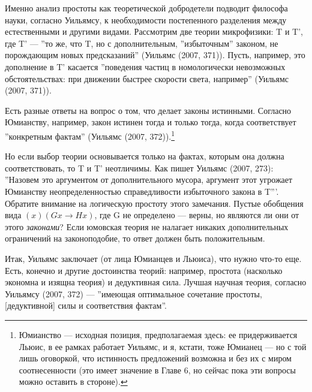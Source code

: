 \documentclass[11pt]{book}
\begin{document}
Именно анализ простоты как теоретической добродетели подводит философа науки, согласно Уильямсу, к необходимости постепенного разделения между естественными и другими видами. Рассмотрим две теории микрофизики: T и T', где T' --- ''то же, что T, но с дополнительным, ''избыточным'' законом, не порождающим новых предсказаний'' (Уильямс (2007, 371)). Пусть, например, это дополнение в T' касается ''поведения частиц в номологически невозможных обстоятельствах: при движении быстрее скорости света, например'' (Уильямс (2007, 371)).

Есть разные ответы на вопрос о том, что делает законы истинными. Согласно Юмианству, например, закон истинен тогда и только тогда, когда соответствует ''конкретным фактам'' (Уильямс (2007, 372)).\footnote{Юмианство --- исходная позиция, предполагаемая здесь: ее придерживается Льюис, в ее рамках работает Уильямс, и я, кстати, тоже Юмианец --- но с той лишь оговоркой, что истинность предложений возможна и без их с миром соотнесенности (это имеет значение в Главе 6, но сейчас пока эти вопросы можно оставить в стороне).}

Но если выбор теории основывается только на фактах, которым она должна соответствовать, то T и T' неотличимы. Как пишет Уильямс (2007, 273): ''Назовем это аргументом от дополнительного мусора, аргумент этот угрожает Юмианству неопределенностью справедливости избыточного закона в T'''. Обратите внимание на логическую простоту этого замечания. Пустые обобщения вида \begin{math}(x)(Gx \rightarrow Hx)\end{math}, где G не определено --- верны, но являются ли они от этого \textit{законами}? Если юмовская теория не налагает никаких дополнительных ограничений на законоподобие, то ответ должен быть положительным.

Итак, Уильямс заключает (от лица Юмианцев и Льюиса), что нужно что-то еще. Есть, конечно и другие достоинства теорий: например, простота (насколько экономна и изящна теория) и дедуктивная сила. Лучшая научная теория, согласно Уильямсу (2007, 372) --- ''имеющая оптимальное сочетание простоты, [дедуктивной] силы и соответствия фактам''.
\end{document}
